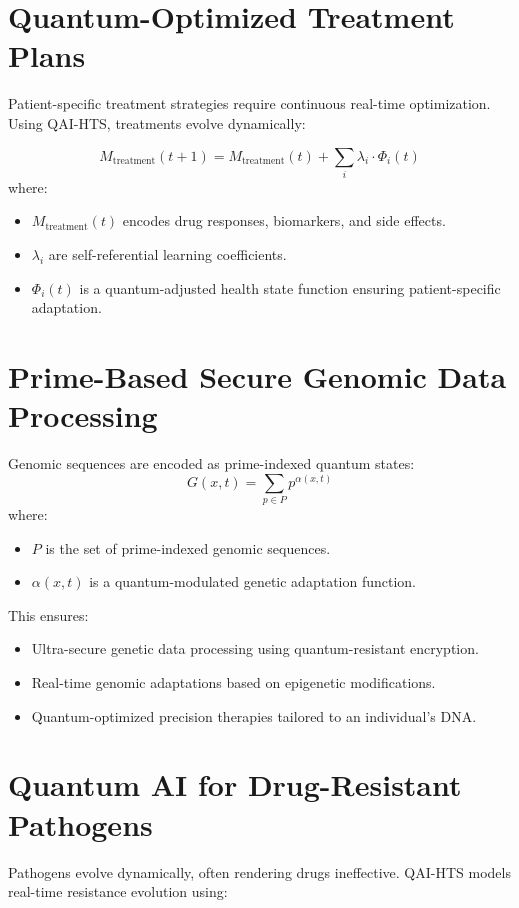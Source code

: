 \documentclass{article}
\theoremstyle{plain}
\begin{document}
\section{Quantum-Optimized Treatment Plans}
Patient-specific treatment strategies require continuous real-time optimization. Using QAI-HTS, treatments evolve dynamically:

\begin{equation}
    M_{\text{treatment}}(t+1) = M_{\text{treatment}}(t) + \sum_{i} \lambda_i \cdot \Phi_i(t)
\end{equation}
where:
\begin{itemize}
    \item \( M_{\text{treatment}}(t) \) encodes drug responses, biomarkers, and side effects.
    \item \( \lambda_i \) are self-referential learning coefficients.
    \item \( \Phi_i(t) \) is a quantum-adjusted health state function ensuring patient-specific adaptation.
\end{itemize}

\section{Prime-Based Secure Genomic Data Processing}
Genomic sequences are encoded as prime-indexed quantum states:
\begin{equation}
    G(x,t) = \sum_{p \in P} p^{\alpha(x,t)}
\end{equation}
where:
\begin{itemize}
    \item \( P \) is the set of prime-indexed genomic sequences.
    \item \( \alpha(x,t) \) is a quantum-modulated genetic adaptation function.
\end{itemize}

This ensures:
\begin{itemize}
    \item Ultra-secure genetic data processing using quantum-resistant encryption.
    \item Real-time genomic adaptations based on epigenetic modifications.
    \item Quantum-optimized precision therapies tailored to an individual's DNA.
\end{itemize}

\section{Quantum AI for Drug-Resistant Pathogens}
Pathogens evolve dynamically, often rendering drugs ineffective. QAI-HTS models real-time resistance evolution using:
\end{document}
